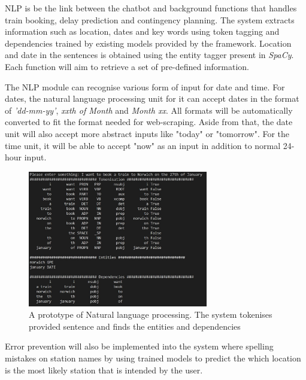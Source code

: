 \documentclass[11pt]{article}
\begin{document}
NLP is be the link between the chatbot and background functions that handles train booking, delay prediction and contingency planning. The system extracts information such as location, dates and key words using token tagging and dependencies trained by existing models provided by the framework. Location and date in the sentences is obtained using the entity tagger present in \textit{SpaCy}. Each function will aim to retrieve a set of pre-defined information.

The NLP module can recognise various form of input for date and time. For dates, the natural language processing unit for it can accept dates in the format of \textit{'dd-mm-yy'}, \textit{xxth of Month} and \textit{Month xx}. All formats will be automatically converted to fit the format needed for web-scraping. Aside from that, the date unit will also accept more abstract inputs like "today" or "tomorrow". For the time unit, it will be able to accept "now" as an input in addition to normal 24-hour input.

\begin{figure}[!htb]
	\centering
	\includegraphics[width=0.7\textwidth]{NLP_Prototype}
	\caption{A prototype of Natural language processing. The system tokenises provided sentence and finds the entities and dependencies }\label{fig:NLP_Prototype}
\end{figure}

Error prevention will also be implemented into the system where spelling mistakes on station names by using trained models to predict the which location is the most likely station that is intended by the user.
\end{document}
